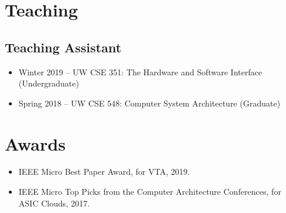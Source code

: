 \documentclass[10pt]{article}
\begin{document}
\section*{Teaching}

\subsection*{Teaching Assistant}

\begin{itemize}
  \item Winter 2019 -- UW CSE 351: The Hardware and Software Interface (Undergraduate)
  \item Spring 2018 -- UW CSE 548: Computer System Architecture (Graduate)
\end{itemize}

\section*{Awards}

\begin{itemize}
  \item IEEE Micro Best Paper Award, for VTA, 2019.
  \item IEEE Micro Top Picks from the Computer Architecture Conferences, for ASIC Clouds, 2017.
\end{itemize}
\end{document}
